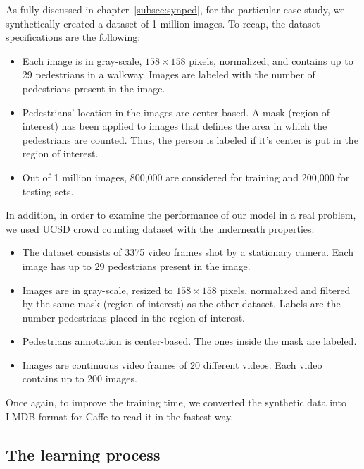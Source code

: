 As fully discussed in chapter~\ref{subsec:synped}, for the particular case study, we synthetically created a dataset of 1 million images. To recap, the dataset specifications are the following:
\begin{itemize}
\item Each image is in gray-scale, $158\times158$ pixels, normalized, and contains up to 29 pedestrians in a walkway. Images are labeled with the number of pedestrians present in the image.  
\item Pedestrians' location in the images are center-based. A mask (region of interest) has been applied to images that defines the area in which the pedestrians are counted. Thus, the person is labeled if it's center is put in the region of interest.   
\item Out of 1 million images, 800,000 are considered for training and 200,000 for testing sets.
\end{itemize} 

\noindent In addition, in order to examine the performance of our model in a real problem, we used UCSD crowd counting dataset \cite{chan2008privacy} with the underneath properties:

\begin{itemize}
\item The dataset consists of 3375 video frames shot by a stationary camera. Each image has up to 29 pedestrians present in the image.
\item Images are in gray-scale, resized to $158\times158$ pixels, normalized and filtered by the same mask (region of interest) as the other dataset. Labels are the number pedestrians placed in the region of interest.
\item Pedestrians annotation is center-based. The ones inside the mask are labeled.  
\item Images are continuous video frames of 20 different videos. Each video contains up to 200 images.  
\end{itemize}

Once again, to improve the training time, we converted the synthetic data into LMDB format for Caffe to read it in the fastest way.


\subsection{The learning process}

